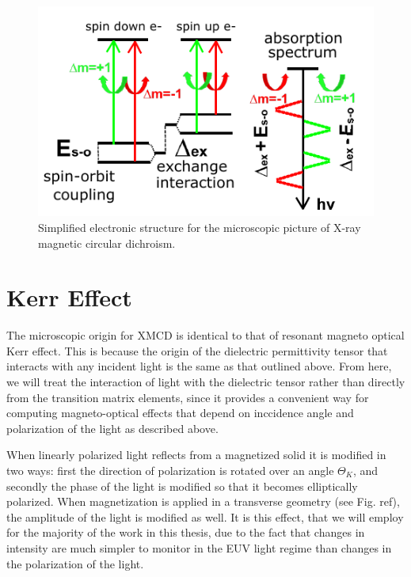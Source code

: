 \begin{figure}
\begin{center}
	\includegraphics[width=150mm]{figs/XMCDMicroscopic.pdf}
\end{center}
\caption{Simplified electronic structure for the microscopic picture of X-ray magnetic circular dichroism. }
\label{XMCDMicroscopic}
\end{figure}

\section{Kerr Effect}

The microscopic origin for XMCD is identical to that of resonant magneto optical Kerr effect. This is because the origin of the dielectric permittivity tensor that interacts with any incident light is the same as that outlined above. From here, we will treat the interaction of light with the dielectric tensor rather than directly from the transition matrix elements, since it provides a convenient way for computing magneto-optical effects that depend on inccidence angle and polarization of the light as described above.

When linearly polarized light reflects from a magnetized solid it is modified in two ways: first the direction of polarization is rotated over an angle $\Theta_K$, and secondly the phase of the light is modified so that it becomes elliptically polarized. When magnetization is applied in a transverse geometry (see Fig. ref), the amplitude of the light is modified as well. It is this effect, that we will employ for the majority of the work in this thesis, due to the fact that changes in intensity are much simpler to monitor in the EUV light regime than changes in the polarization of the light.

